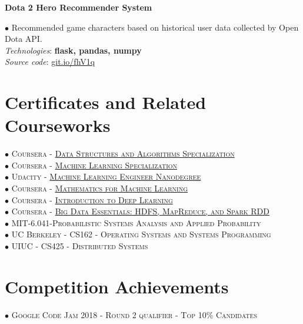 \documentclass[10pt]{article}
\begin{document}
        \begin{center}
            \textbf{Dota 2 Hero Recommender System}
        \end{center}
        $\bullet$ {Recommended game characters based on historical user data collected by Open Dota API.} \\
        \emph{Technologies}: \textbf{flask, pandas, numpy} \\
        \emph{Source code}: \href{https://git.io/fhV1q}{git.io/fhV1q}


    \section{Certificates and Related Courseworks}

        $\bullet$ \textsc{Coursera - \href{https://www.coursera.org/account/accomplishments/specialization/certificate/AKFYZQ9QD8XH}{Data Structures and Algorithms Specialization}} \\
        $\bullet$ \textsc{Coursera - \href{https://www.coursera.org/account/accomplishments/specialization/certificate/ZUGAFYKCMQ79}{Machine Learning Specialization}} \\
        $\bullet$ \textsc{Udacity - \href{https://graduation.udacity.com/confirm/HK9JLR3N}{Machine Learning Engineer Nanodegree}} \\
        $\bullet$ \textsc{Coursera - \href{https://www.coursera.org/account/accomplishments/specialization/certificate/N3D6C3DT8QAY?utm_medium=certificate&utm_source=link&utm_campaign=copybutton_certificate}{Mathematics for Machine Learning}} \\
        $\bullet$ \textsc{Coursera - \href{https://www.coursera.org/account/accomplishments/certificate/XN2B7T4AJX8C}{Introduction to Deep Learning}} \\
        $\bullet$ \textsc{Coursera - \href{https://www.coursera.org/account/accomplishments/certificate/G25TQPPNXGW5}{Big Data Essentials: HDFS, MapReduce, and Spark RDD}} \\
        $\bullet$ \textsc{MIT-6.041-Probabilistic Systems Analysis and Applied Probability} \\
        $\bullet$ \textsc{UC Berkeley - CS162 - Operating Systems and Systems Programming} \\
        $\bullet$ \textsc{UIUC - CS425 - Distributed Systems}

    \section{Competition Achievements}
        $\bullet$ \textsc{Google Code Jam 2018 - Round 2 qualifier - Top 10\% Candidates}
\end{document}
